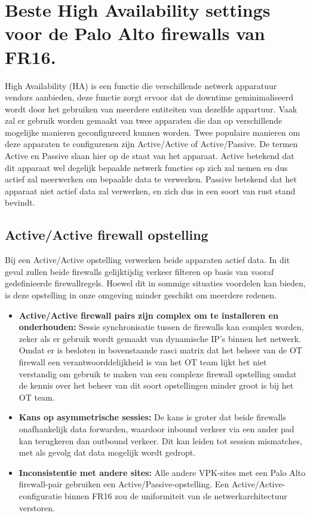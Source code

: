 \section{Beste High Availability settings voor de Palo Alto firewalls van FR16.}


High Availability (HA) is een functie die verschillende netwerk apparatuur vendors aanbieden, deze functie zorgt ervoor dat de downtime geminimaliseerd wordt door het gebruiken van meerdere entiteiten van dezelfde appartuur. Vaak zal er gebruik worden gemaakt van twee apparaten die dan op verschillende mogelijke manieren geconfigureerd kunnen worden. Twee populaire manieren om deze apparaten te configurenen zijn Active/Active of Active/Passive. De termen Active en Passive slaan hier op de staat van het apparaat. Active betekend dat dit apparaat wel degelijk bepaalde netwerk functies op zich zal nemen en dus actief zal meerwerken om bepaalde data te verwerken. Passive betekend dat het apparaat niet actief data zal verwerken, en zich dus in een soort van rust stand bevindt.

\subsection{Active/Active firewall opstelling}
Bij een Active/Active opstelling verwerken beide apparaten actief data. In dit geval zullen beide firewalls gelijktijdig verkeer filteren op basis van vooraf gedefinieerde firewallregels. Hoewel dit in sommige situaties voordelen kan bieden, is deze opstelling in onze omgeving minder geschikt om meerdere redenen.
\newline



\begin{itemize}
    \item \textbf{Active/Active firewall pairs zijn complex om te installeren en onderhouden:}  Sessie synchronisatie tussen de firewalls kan complex worden, zeker als er gebruik wordt gemaakt van dynamische IP’s binnen het netwerk. Omdat er is besloten in bovenstaande rasci matrix dat het beheer van de OT firewall een verantwoorddelijkheid is van het OT team lijkt het niet verstandig om gebruik te maken van een complexe firewall opstelling omdat de kennis over het beheer van dit soort opstellingen minder groot is bij het OT team. 
    
    \item \textbf{Kans op asymmetrische sessies:} De kans is groter dat beide firewalls onafhankelijk data forwarden, waardoor inbound verkeer via een ander pad kan terugkeren dan outbound verkeer. Dit kan leiden tot session mismatches, met als gevolg dat data mogelijk wordt gedropt.
    
    \item \textbf{Inconsistentie met andere sites:}  Alle andere VPK-sites met een Palo Alto firewall-pair gebruiken een Active/Passive-opstelling. Een Active/Active-configuratie binnen FR16 zou de uniformiteit van de netwerkarchitectuur verstoren.

\end{itemize}

